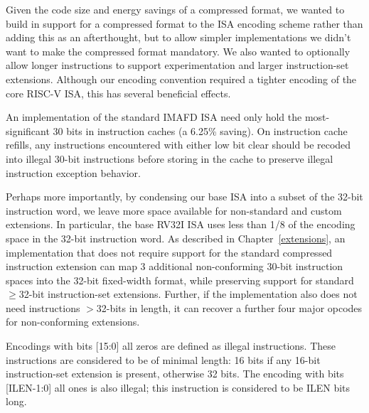 \begin{samepage-commentary}
Given the code size and energy savings of a compressed format, we
wanted to build in support for a compressed format to the ISA encoding
scheme rather than adding this as an afterthought, but to allow
simpler implementations we didn't want to make the compressed format
mandatory. We also wanted to optionally allow longer instructions to
support experimentation and larger instruction-set extensions.
Although our encoding convention required a tighter encoding of the
core RISC-V ISA, this has several beneficial effects.

An implementation of the standard IMAFD ISA need only hold the
most-significant 30 bits in instruction caches (a 6.25\% saving).  On
instruction cache refills, any instructions encountered with either
low bit clear should be recoded into illegal 30-bit instructions
before storing in the cache to preserve illegal instruction exception
behavior.

Perhaps more importantly, by condensing our base ISA into a subset of
the 32-bit instruction word, we leave more space available for
non-standard and custom extensions.  In particular, the base RV32I ISA
uses less than 1/8 of the encoding space in the 32-bit instruction
word.  As described in Chapter~\ref{extensions}, an implementation
that does not require support for the standard compressed instruction
extension can map 3 additional non-conforming 30-bit instruction
spaces into the 32-bit fixed-width format, while preserving support
for standard $\geq$32-bit instruction-set extensions.  Further, if the
implementation also does not need instructions $>$32-bits in length,
it can recover a further four major opcodes for non-conforming extensions.
\end{samepage-commentary}

Encodings with bits [15:0] all zeros are defined as illegal
instructions.  These instructions are considered to be of minimal
length: 16 bits if any 16-bit instruction-set extension is present,
otherwise 32 bits.  The encoding with bits [ILEN-1:0] all ones is also
illegal; this instruction is considered to be ILEN bits long.

